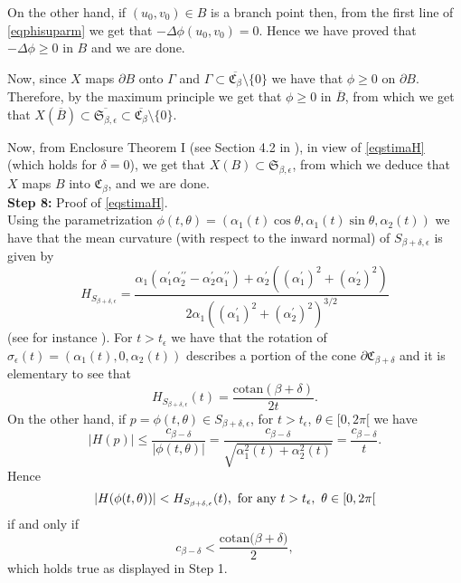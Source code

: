 \documentclass[a4paper,reqno,10pt,oneside]{amsart}
\numberwithin{equation}{section}
\begin{document}
On the other hand, if $(u_0,v_0)\in B$ is a branch point then, from the first line of \eqref{eqphisuparm} we get that $-\Delta \phi (u_0,v_0)=0$. Hence we have proved that $-\Delta \phi \geq 0$ in $B$ and we are done.

Now, since $X$ maps $\partial B$ onto $\Gamma$ and $\Gamma \subset \overline{\mathfrak{C}_\beta} \setminus \{0\}$ we have that $\phi\geq 0$ on $\partial B$. Therefore, by the maximum principle we get that $\phi\geq 0$ in $\overline B$,  from which we get that $X(\overline B)\subset \overline {\mathfrak{S}_{\beta,{\epsilon}}} \subset \overline{\mathfrak{C}_\beta}\setminus \{0\}$. 

Now, from Enclosure Theorem I (see Section 4.2 in \cite{RegMinSurf}), in view of \eqref{eqstimaH} (which holds for $\delta=0$), we get that $X(B) \subset \mathfrak{S}_{\beta, {\epsilon}}$, from which we deduce that $X$ maps $B$ into $\mathfrak{C}_\beta$, and we are done.\\

 \noindent\textbf{Step 8:} Proof of \eqref{eqstimaH}.\\
Using the parametrization $\phi(t,\theta)=(\alpha_1(t)\cos \theta, \alpha_1(t) \sin \theta, \alpha_2(t))$ 
 we have that the mean curvature (with respect to the inward normal) of $S_{\beta + \delta,\epsilon}$ is given by 
$$ H_{S_{\beta + \delta,\epsilon}}=\frac{\alpha_1 (\alpha_1^{\prime}  \alpha_2^{\prime\prime}-\alpha_2^{\prime} \alpha_1^{\prime\prime}) + \alpha_2^{\prime} ((\alpha_1^{\prime})^2 + (\alpha_2^{\prime})^2)}{2\alpha_1 ((\alpha_1^{\prime})^2 + (\alpha_2^{\prime})^2)^{3/2}}$$
(see for instance \cite{AbateTovena}). For $t>t_{\epsilon}$ we have that the rotation of $\sigma_{\epsilon}(t)=(\alpha_1(t),0,\alpha_2(t))$ describes a portion of the cone $\partial\mathfrak{C}_{\beta+\delta}$ and it is elementary to see that
$$H_{S_{\beta + \delta,\epsilon}}(t)=\frac{\mathrm{cotan}(\beta+\delta)}{2t}.$$
On the other hand, if $p=\phi(t,\theta) \in S_{\beta + \delta,\epsilon}$, 
for $t>t_{\epsilon}$, $\theta \in [0,2\pi[$ we have
$$|H(p)|\leq \frac{c_{\beta-\delta}}{|\phi(t,\theta)|}= \frac{c_{\beta-\delta}}{\sqrt{\alpha_1^2(t)+\alpha_2^2(t)}}= \frac{c_{\beta-\delta}}{t}.$$
Hence 
\begin{equation}\label{eq1prelstimaH}
|H(\phi(t,\theta))| < H_{S_{\beta + \delta,\epsilon}}(t),\ \hbox{for any} \ t>t_{\epsilon}, \ \theta \in [0,2\pi[
\end{equation}
 if and only if
$$ c_{\beta-\delta} < \frac{\mathrm{cotan}{(\beta+\delta})}{2},$$
which holds true as displayed in Step 1.
\end{document}

